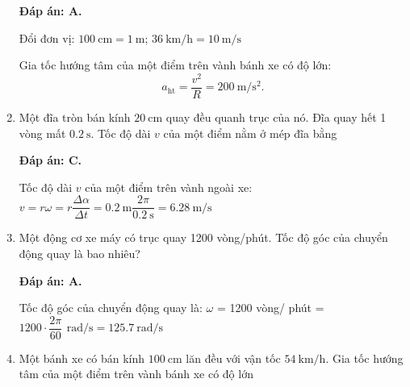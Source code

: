 \begin{enumerate}[label=\bfseries Câu \arabic*:]
	\hideall
	{	
		\textbf{Đáp án: A.}
		
		Đổi đơn vị: $\SI{100}{\centi\meter}=\SI{1}{\meter}$; $\SI{36}{\kilo\meter/\hour}=\SI{10}{\meter/\second}$
		
		Gia tốc hướng tâm của một điểm trên vành bánh xe có độ lớn:
		$$a_\text{ht}=\dfrac{v^2}{R}=\SI{200}{\meter/\second^2}.$$
	}
	\item {}
	
	
	{
		Một đĩa tròn bán kính $\SI{20}{\centi\meter}$ quay đều quanh trục của nó. Đĩa quay hết 1 vòng mất $\SI{0.2}{\second}$. Tốc độ dài $v$ của một điểm nằm ở mép đĩa bằng
	}
	
	\hideall
	{	
		\textbf{Đáp án: C.}
		
		Tốc độ dài $v$ của một điểm trên vành ngoài xe:
		$v=r\omega=r\dfrac{\Delta \alpha}{\Delta t}=\SI{0,2}{\meter}\dfrac{2\pi}{\SI{0.2}{\second}}=\SI{6,28}{\meter/\second}$
	}
	\item {}
	
	
	{
		Một động cơ xe máy có trục quay 1200 vòng/phút. Tốc độ góc của chuyển động quay là bao nhiêu?
	}
	
	\hideall
	{	
		\textbf{Đáp án: A.}
		
		Tốc độ góc của chuyển động quay là:
		$\omega$ = 1200 vòng/ phút = $1200\cdot\dfrac{2\pi}{60}\,\SI{}{\radian/\second}=\SI{125,7}{\radian/\second}$
	}
	\item {}
	
	
	{
		Một bánh xe có bán kính $\SI{100}{\centi\meter}$ lăn đều với vận tốc $\SI{54}{\kilo\meter/\hour}$. Gia tốc hướng tâm của một điểm trên vành bánh xe có độ lớn
	}
	

\end{enumerate}
